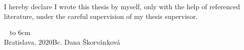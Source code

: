 \documentclass[12pt, a4paper, oneside]{book}
\newcommand\mfauthor{Bc. Dana Škorvánková}
\newcommand\mfplacedate{Bratislava, 2020}
\begin{document}
\thispagestyle{empty}


\begin{figure}[H]
\begin{center}
\label{img:zadanie}
\end{center}
\end{figure}

{~}\vspace{12cm}

\noindent
\begin{minipage}{0.25\textwidth}~\end{minipage}
\begin{minipage}{0.75\textwidth}
I hereby declare I wrote this thesis by myself, only with the help of
referenced literature, under the careful supervision of my thesis
supervisor.
\newline \newline
\end{minipage}
\vfill
~ \hfill {\hbox to 6cm{\dotfill}} \\
\mfplacedate \hfill \mfauthor
\vfill\eject 
\end{document}
